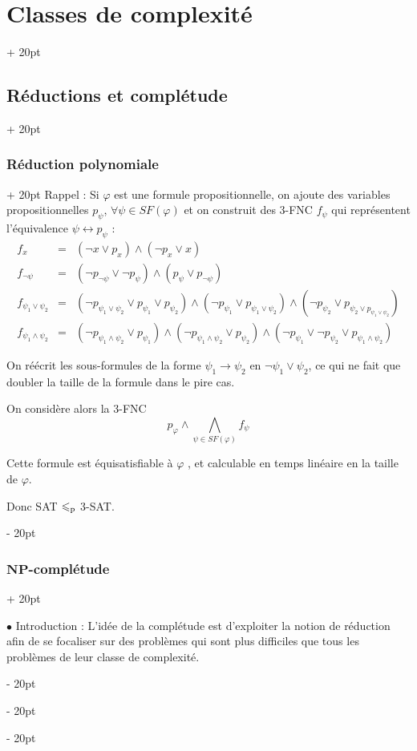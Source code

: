 \documentclass[a4paper, 12pt, twoside]{article}
\renewcommand{\le}{\leqslant}
\newcommand{\ind}[1][20pt]{\advance\leftskip + #1}
\newcommand{\deind}[1][20pt]{\advance\leftskip - #1}
\newenvironment{indt}[2][20pt]{#2 \par \ind[#1]}{\par \deind} %
\begin{document}
\begin{indt}{\section{Classes de complexité}}
\begin{indt}{\subsection{Réductions et complétude}}
\begin{indt}{\subsubsection{Réduction polynomiale}}
                Rappel : Si $\varphi$ est une formule propositionnelle, on ajoute des variables propositionnelles $p_\psi$, $\forall \psi \in SF(\varphi)$ et on construit des 3-FNC $f_\psi$ qui représentent l'équivalence $\psi \leftrightarrow p_\psi$ :
                \[
                    \begin{array}{rcl}
                        f_x &=& (\neg x \vee p_x) \wedge (\neg p_x \vee x)
                        \\
                        f_{\neg \psi} &=& (\neg p_{\neg \psi} \vee \neg p_\psi) \wedge (p_\psi \vee p_{\neg \psi})
                        \\
                        f_{\psi_1 \vee \psi_2} &=& (\neg p_{\psi_1 \vee \psi_2} \vee p_{\psi_1} \vee p_{\psi_2}) \wedge (\neg p_{\psi_1} \vee p_{\psi_1 \vee \psi_2}) \wedge (\neg p_{\psi_2} \vee p_{\psi_2 \vee p_{\psi_1 \vee \psi_2}})
                        \\
                        f_{\psi_1 \wedge \psi_2} &=& (\neg p_{\psi_1 \wedge \psi_2} \vee p_{\psi_1}) \wedge (\neg p_{\psi_1 \wedge \psi_2} \vee p_{\psi_2}) \wedge (\neg p_{\psi_1} \vee \neg p_{\psi_2} \vee p_{\psi_1 \wedge \psi_2})
                    \end{array}
                \]

                On réécrit les sous-formules de la forme $\psi_1 \rightarrow \psi_2$ en $\neg \psi_1 \vee \psi_2$, ce qui ne fait que doubler la taille de la formule dans le pire cas.

                On considère alors la 3-FNC
                \[
                    p_\varphi \wedge \bigwedge_{\psi \in SF(\varphi)} f_\psi
                \]

                Cette formule est équisatisfiable à $\varphi$ , et calculable en temps linéaire en la taille de $\varphi$.

                Donc SAT $\le_{\rm p}$ 3-SAT.
            \end{indt}

            \vspace{12pt}
            
            \begin{indt}{\subsubsection{$\mathbf{NP}$-complétude}}
                \label{2.3.2}

                $\bullet$ Introduction : L'idée de la complétude est d'exploiter la notion de réduction afin de se focaliser sur des problèmes qui sont plus difficiles que tous les problèmes de leur classe de complexité.


\end{indt}
\end{indt}
\end{indt}
\end{document}
